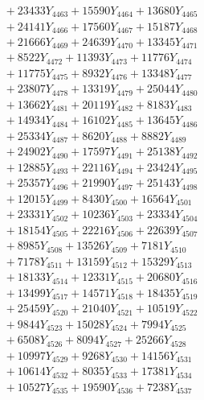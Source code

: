 \documentclass[a4paper,10pt]{article}
\begin{document}
{\begin{align}
&\;  + 23433 Y_{4463} + 15590 Y_{4464} + 13680 Y_{4465} \\[0.3ex]
&\;  + 24141 Y_{4466} + 17560 Y_{4467} + 15187 Y_{4468} \\[0.5ex]\allowbreak
&\;  + 21666 Y_{4469} + 24639 Y_{4470} + 13345 Y_{4471} \\[0.3ex]
&\;  + 8522 Y_{4472} + 11393 Y_{4473} + 11776 Y_{4474} \\[0.3ex]
&\;  + 11775 Y_{4475} + 8932 Y_{4476} + 13348 Y_{4477} \\[0.3ex]
&\;  + 23807 Y_{4478} + 13319 Y_{4479} + 25044 Y_{4480} \\[0.3ex]
&\;  + 13662 Y_{4481} + 20119 Y_{4482} + 8183 Y_{4483} \\[0.3ex]
&\;  + 14934 Y_{4484} + 16102 Y_{4485} + 13645 Y_{4486} \\[0.3ex]
&\;  + 25334 Y_{4487} + 8620 Y_{4488} + 8882 Y_{4489} \\[0.3ex]
&\;  + 24902 Y_{4490} + 17597 Y_{4491} + 25138 Y_{4492} \\[0.3ex]
&\;  + 12885 Y_{4493} + 22116 Y_{4494} + 23424 Y_{4495} \\[0.3ex]
&\;  + 25357 Y_{4496} + 21990 Y_{4497} + 25143 Y_{4498} \\[0.5ex]\allowbreak
&\;  + 12015 Y_{4499} + 8430 Y_{4500} + 16564 Y_{4501} \\[0.3ex]
&\;  + 23331 Y_{4502} + 10236 Y_{4503} + 23334 Y_{4504} \\[0.3ex]
&\;  + 18154 Y_{4505} + 22216 Y_{4506} + 22639 Y_{4507} \\[0.3ex]
&\;  + 8985 Y_{4508} + 13526 Y_{4509} + 7181 Y_{4510} \\[0.3ex]
&\;  + 7178 Y_{4511} + 13159 Y_{4512} + 15329 Y_{4513} \\[0.3ex]
&\;  + 18133 Y_{4514} + 12331 Y_{4515} + 20680 Y_{4516} \\[0.3ex]
&\;  + 13499 Y_{4517} + 14571 Y_{4518} + 18435 Y_{4519} \\[0.3ex]
&\;  + 25459 Y_{4520} + 21040 Y_{4521} + 10519 Y_{4522} \\[0.3ex]
&\;  + 9844 Y_{4523} + 15028 Y_{4524} + 7994 Y_{4525} \\[0.3ex]
&\;  + 6508 Y_{4526} + 8094 Y_{4527} + 25266 Y_{4528} \\[0.5ex]\allowbreak
&\;  + 10997 Y_{4529} + 9268 Y_{4530} + 14156 Y_{4531} \\[0.3ex]
&\;  + 10614 Y_{4532} + 8035 Y_{4533} + 17381 Y_{4534} \\[0.3ex]
&\;  + 10527 Y_{4535} + 19590 Y_{4536} + 7238 Y_{4537} \\[0.3ex]

\end{align}}
\end{document}
